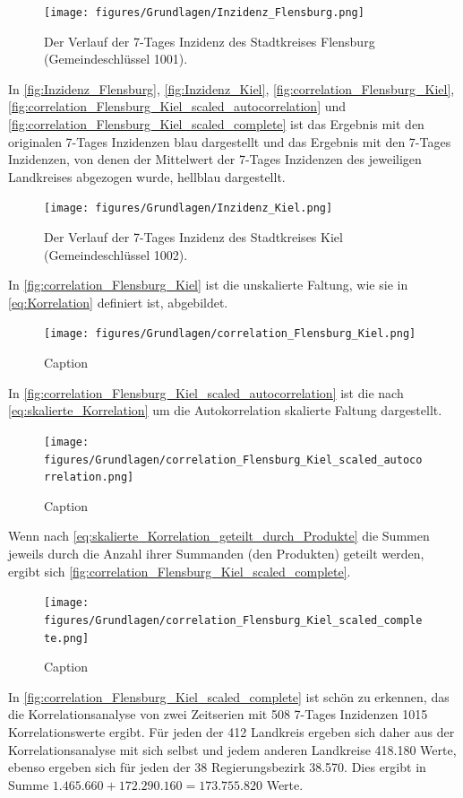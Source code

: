 \begin{figure}[H]
    \centering
    \texttt{[image: figures/Grundlagen/Inzidenz\_Flensburg.png]}
    \caption{Der Verlauf der 7-Tages Inzidenz des Stadtkreises Flensburg (Gemeindeschlüssel 1001).}
    \label{fig:Inzidenz_Flensburg}
\end{figure}
In \autoref{fig:Inzidenz_Flensburg}, \autoref{fig:Inzidenz_Kiel}, \autoref{fig:correlation_Flensburg_Kiel}, \autoref{fig:correlation_Flensburg_Kiel_scaled_autocorrelation} und \autoref{fig:correlation_Flensburg_Kiel_scaled_complete} ist das Ergebnis mit den originalen 7-Tages Inzidenzen blau dargestellt und das Ergebnis mit den 7-Tages Inzidenzen, von denen der Mittelwert der 7-Tages Inzidenzen des jeweiligen Landkreises abgezogen wurde, hellblau dargestellt.
\begin{figure}[H]
    \centering
    \texttt{[image: figures/Grundlagen/Inzidenz\_Kiel.png]}
    \caption{Der Verlauf der 7-Tages Inzidenz des Stadtkreises Kiel (Gemeindeschlüssel 1002).}
    \label{fig:Inzidenz_Kiel}
\end{figure}
In \autoref{fig:correlation_Flensburg_Kiel} ist die unskalierte Faltung, wie sie in \autoref{eq:Korrelation} definiert ist, abgebildet.
\begin{figure}[H]
    \centering
    \texttt{[image: figures/Grundlagen/correlation\_Flensburg\_Kiel.png]}
    \caption{Caption}
    \label{fig:correlation_Flensburg_Kiel}
\end{figure}
In \autoref{fig:correlation_Flensburg_Kiel_scaled_autocorrelation} ist die nach \autoref{eq:skalierte_Korrelation} um die Autokorrelation skalierte Faltung dargestellt.
\begin{figure}[H]
    \centering
    \texttt{[image: figures/Grundlagen/correlation\_Flensburg\_Kiel\_scaled\_autocorrelation.png]}
    \caption{Caption}
    \label{fig:correlation_Flensburg_Kiel_scaled_autocorrelation}
\end{figure}
Wenn nach \autoref{eq:skalierte_Korrelation_geteilt_durch_Produkte} die  Summen jeweils durch die Anzahl ihrer Summanden (den Produkten) geteilt werden, ergibt sich \autoref{fig:correlation_Flensburg_Kiel_scaled_complete}.
\begin{figure}[H]
    \centering
    \texttt{[image: figures/Grundlagen/correlation\_Flensburg\_Kiel\_scaled\_complete.png]}
    \caption{Caption}
    \label{fig:correlation_Flensburg_Kiel_scaled_complete}
\end{figure}

In \autoref{fig:correlation_Flensburg_Kiel_scaled_complete} ist schön zu erkennen, das die Korrelationsanalyse von zwei Zeitserien mit 508 7-Tages Inzidenzen 1015 Korrelationswerte ergibt.
Für jeden der 412 Landkreis ergeben sich daher aus der Korrelationsanalyse mit sich selbst und jedem anderen Landkreise 418.180 Werte, ebenso ergeben sich für jeden der 38 Regierungsbezirk 38.570. Dies ergibt in Summe $
1.465.660+172.290.160=173.755.820$ Werte.

